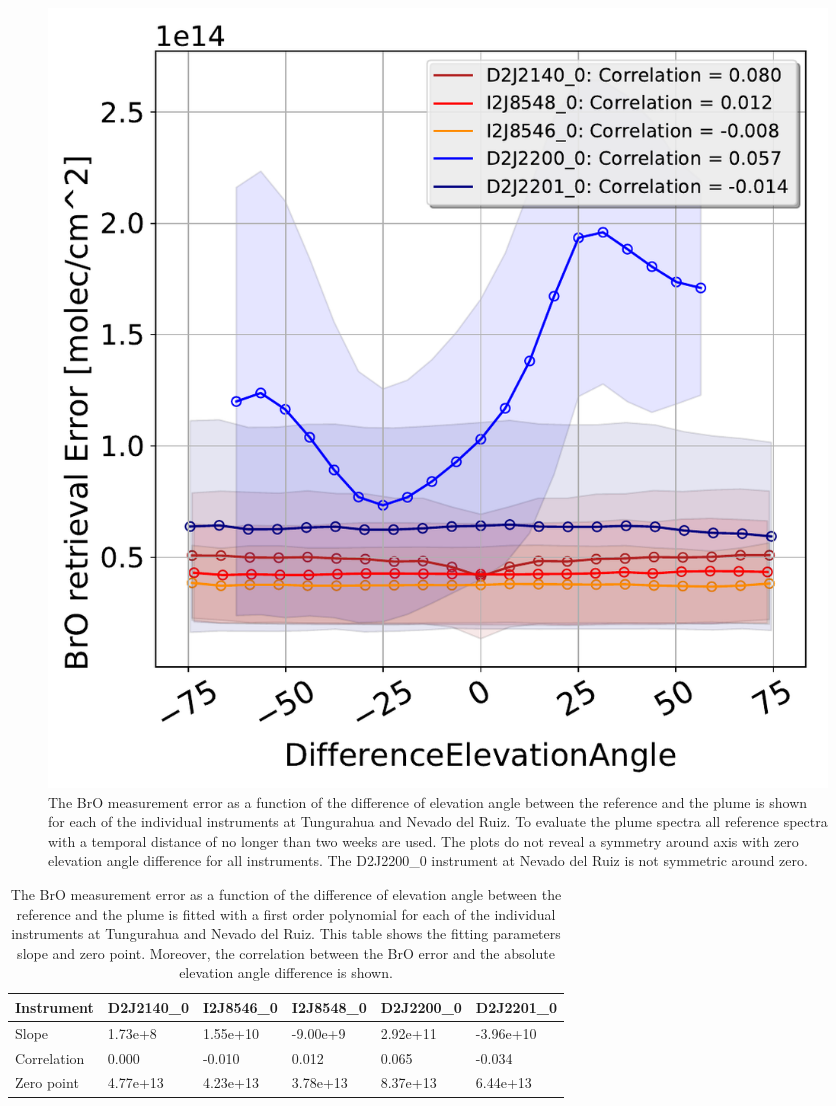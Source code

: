 \begin{figure}
	\centering
	\includegraphics[width=0.7\linewidth]{Bilder/DiffElevAngleallInstruments}
	\caption{The BrO measurement error as a function of the difference of elevation angle between the reference and the plume is shown for each of the individual instruments at Tungurahua and Nevado del Ruiz. To evaluate the plume spectra all reference spectra with a temporal distance of no longer than two weeks are used. The plots do not reveal a symmetry around axis with zero elevation angle difference for all instruments. The D2J2200\_0 instrument at Nevado del Ruiz is not symmetric around zero.}
	\label{fig:diffeleangle}
\end{figure}
\begin{table}[h]
	\centering
	\begin{tabular}{|p{2cm}|p{2cm}|p{2cm}|p{2cm}|p{2cm}|p{2cm}|}
		Instrument	&D2J2140\_0&I2J8546\_0& I2J8548\_0&D2J2200\_0&D2J2201\_0\\
		\toprule
		Slope& 1.73e+8& 1.55e+10  &-9.00e+9 &2.92e+11&-3.96e+10\\
		\midrule
		Correlation&
		0.000&
		-0.010&
		0.012&
		0.065&
		-0.034\\
		\midrule
		Zero point&4.77e+13&4.23e+13&3.78e+13&8.37e+13 &6.44e+13 \\
		\bottomrule
	\end{tabular}
	\caption{The BrO measurement error as a function of the difference of elevation angle between the reference and the plume is fitted with a first order polynomial for each of the individual instruments at Tungurahua and Nevado del Ruiz. This table shows the fitting parameters slope and zero point. Moreover, the correlation between the BrO error and the absolute elevation angle difference is shown. }
\end{table}
